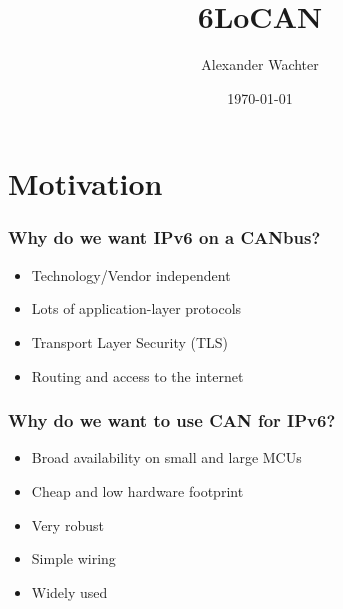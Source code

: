 \documentclass[aspectratio=169]{beamer}
\title[Title]{6LoCAN \\}
\author{Alexander Wachter}
\date{\today}
\institute[Institute of Technical Informatics]{ Institute of Technical Informatics\\ Networked Embedded Systems}
\begin{document}
\titleframe


\section{Motivation}

\begin{frame}
	\frametitle{Why do we want IPv6 on a CANbus?}
	\begin{itemize}
		\item Technology/Vendor independent
		\item Lots of application-layer protocols
		\item Transport Layer Security (TLS)
		\item Routing and access to the internet
	\end{itemize}
\end{frame}

\begin{frame}
	\frametitle{Why do we want to use CAN for IPv6?}
	\begin{itemize}
		\item Broad availability on small and large MCUs
		\item Cheap and low hardware footprint
		\item Very robust
		\item Simple wiring
		\item Widely used
	\end{itemize}
\end{frame}
\end{document}

